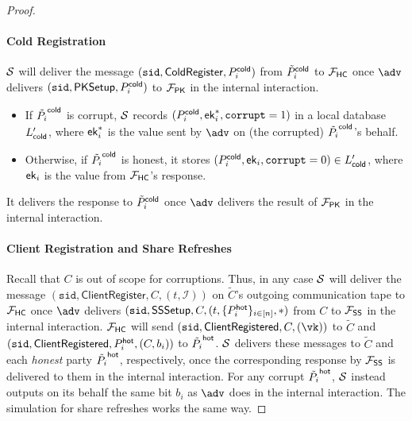 \begin{proof}
\paragraph{Cold Registration} $\mathcal{S}$ will deliver the message $(\texttt{sid}, \mathsf{ColdRegister}, P_i^{\mathsf{cold}})$ from $\tilde{P}_i^{\mathsf{cold}}$ to $\mathcal{F}_\mathsf{HC}$ once $\adv$ delivers $(\texttt{sid}, \mathsf{PKSetup}, P_i^{\mathsf{cold}})$ to $\mathcal{F}_\mathsf{PK}$ in the internal interaction.
\begin{itemize}
    \item If $\tilde{P_i}^{\mathsf{cold}}$ is corrupt, $\mathcal{S}$ records $(P_i^{\mathsf{cold}}, \mathsf{ek}_i^*, \texttt{corrupt} = 1)$ in a local database $L_{\mathsf{cold}}'$, where $\mathsf{ek}_i^*$ is the value sent by $\adv$ on (the corrupted) $\tilde{P_i}^{\mathsf{cold}}$'s behalf.
    \item Otherwise, if $\tilde{P_i}^{\mathsf{cold}}$ is honest, it stores $(P_i^{\mathsf{cold}}, \mathsf{ek}_i, \texttt{corrupt} = 0) \in L_{\mathsf{cold}}'$, where $\mathsf{ek}_i$ is the value from $\mathcal{F}_\mathsf{HC}$'s response.
\end{itemize}
It delivers the response to $\tilde{P}_i^{\mathsf{cold}}$ once $\adv$ delivers the result of $\mathcal{F}_\mathsf{PK}$ in the internal interaction. 

\paragraph{Client Registration and Share Refreshes}
Recall that $C$ is out of scope for corruptions. Thus, in any case $\mathcal{S}$ will deliver the message $(\texttt{sid}, \mathsf{ClientRegister}, C,\allowbreak (t, \mathcal{I}))$ on $\tilde{C}$'s outgoing communication tape to $\mathcal{F}_\mathsf{HC}$ once $\adv$ delivers $(\texttt{sid}, \mathsf{SSSetup}, C, (t, \{P_i^{\mathsf{hot}}\}_{i \in [n]}, *)$ from $C$ to $\mathcal{F}_\mathsf{SS}$ in the internal interaction. $\mathcal{F}_\mathsf{HC}$ will send $(\texttt{sid}, \mathsf{ClientRegistered}, C, (\vk))$ to $\tilde{C}$ and $(\texttt{sid},\allowbreak \mathsf{ClientRegistered}, P_i^{\mathsf{hot}}, (C, b_i))$ to $\tilde{P_i}^{\mathsf{hot}}$. $\mathcal{S}$ delivers these messages to $\tilde{C}$ and each \emph{honest} party $\tilde{P_i}^{\mathsf{hot}}$, respectively, once the corresponding response by $\mathcal{F}_\mathsf{SS}$ is delivered to them in the internal interaction.
For any corrupt $\tilde{P_i}^{\mathsf{hot}}$, $\mathcal{S}$ instead outputs on its behalf the same bit $b_i$ as $\adv$ does in the internal interaction. The simulation for share refreshes works the same way.


\end{proof}
